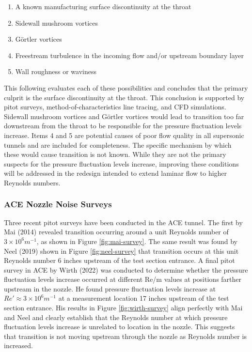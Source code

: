 \begin{enumerate}
    \item A known manufacturing surface discontinuity at the throat
    \item Sidewall mushroom vortices
    \item Görtler vortices
    \item Freestream turbulence in the incoming flow and/or upstream boundary layer
    \item Wall roughness or waviness
\end{enumerate}

This following evaluates each of these possibilities and concludes that the primary culprit is the surface discontinuity at the throat. This conclusion is supported by pitot surveys, method-of-characteristics line tracing, and CFD simulations. Sidewall mushroom vortices and Görtler vortices would lead to transition too far downstream from the throat to be responsible for the pressure fluctuation levels increase. Items 4 and 5 are potential causes of poor flow quality in all supersonic tunnels and are included for completeness. The specific mechanism by which these would cause transition is not known. While they are not the primary suspects for the pressure fluctuation levels increase, improving these conditions will be addressed in the redesign intended to extend laminar flow to higher Reynolds numbers.

\subsubsection*{ACE Nozzle Noise Surveys}

Three recent pitot surveys have been conducted in the ACE tunnel. The first by Mai (2014) revealed transition occurring around a unit Reynolds number of $3 \times 10^6 m^{-1}$, as shown in Figure \ref{fig:mai-survey}. The same result was found by Neel (2019) shown in Figure \ref{fig:neel-survey} that transition occurs at this unit Reynolds number 6 inches upstream of the test section entrance. A final pitot survey in ACE by Wirth (2022) was conducted to determine whether the pressure fluctuation levels increase occurred at different Re/m values at positions farther upstream in the nozzle. He found pressure fluctuation levels increase at $Re' \approx 3 \times 10^6 m^{-1}$ at a measurement location 17 inches upstream of the test section entrance. His results in Figure \ref{fig:wirth-survey} align perfectly with Mai and Neel and clearly establish that the Reynolds number at which pressure fluctuation levels increase is unrelated to location in the nozzle. This suggests that transition is not moving upstream through the nozzle as Reynolds number is increased.

